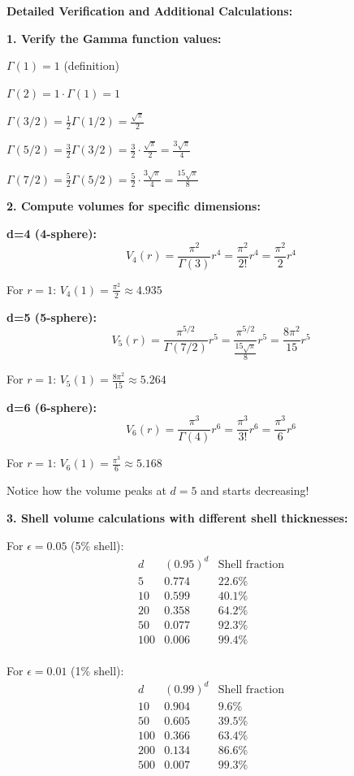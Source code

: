 \documentclass[12pt]{article}
\begin{document}
\begin{computation}
\textbf{Detailed Verification and Additional Calculations:}

\textbf{1. Verify the Gamma function values:}

\(\Gamma(1) = 1\) (definition)

\(\Gamma(2) = 1 \cdot \Gamma(1) = 1\)

\(\Gamma(3/2) = \frac{1}{2} \Gamma(1/2) = \frac{\sqrt{\pi}}{2}\)

\(\Gamma(5/2) = \frac{3}{2} \Gamma(3/2) = \frac{3}{2} \cdot \frac{\sqrt{\pi}}{2} = \frac{3\sqrt{\pi}}{4}\)

\(\Gamma(7/2) = \frac{5}{2} \Gamma(5/2) = \frac{5}{2} \cdot \frac{3\sqrt{\pi}}{4} = \frac{15\sqrt{\pi}}{8}\)

\textbf{2. Compute volumes for specific dimensions:}

\textbf{d=4 (4-sphere):}
\[
V_4(r) = \frac{\pi^2}{\Gamma(3)} r^4 = \frac{\pi^2}{2!} r^4 = \frac{\pi^2}{2} r^4
\]

For \(r=1\): \(V_4(1) = \frac{\pi^2}{2} \approx 4.935\)

\textbf{d=5 (5-sphere):}
\[
V_5(r) = \frac{\pi^{5/2}}{\Gamma(7/2)} r^5 = \frac{\pi^{5/2}}{\frac{15\sqrt{\pi}}{8}} r^5 = \frac{8\pi^2}{15} r^5
\]

For \(r=1\): \(V_5(1) = \frac{8\pi^2}{15} \approx 5.264\)

\textbf{d=6 (6-sphere):}
\[
V_6(r) = \frac{\pi^3}{\Gamma(4)} r^6 = \frac{\pi^3}{3!} r^6 = \frac{\pi^3}{6} r^6
\]

For \(r=1\): \(V_6(1) = \frac{\pi^3}{6} \approx 5.168\)

Notice how the volume peaks at \(d=5\) and starts decreasing!

\textbf{3. Shell volume calculations with different shell thicknesses:}

For \(\epsilon = 0.05\) (5\% shell):
\[
\begin{array}{c|c|c}
d & (0.95)^d & \text{Shell fraction} \\
\hline
5 & 0.774 & 22.6\% \\
10 & 0.599 & 40.1\% \\
20 & 0.358 & 64.2\% \\
50 & 0.077 & 92.3\% \\
100 & 0.006 & 99.4\% \\
\end{array}
\]

For \(\epsilon = 0.01\) (1\% shell):
\[
\begin{array}{c|c|c}
d & (0.99)^d & \text{Shell fraction} \\
\hline
10 & 0.904 & 9.6\% \\
50 & 0.605 & 39.5\% \\
100 & 0.366 & 63.4\% \\
200 & 0.134 & 86.6\% \\
500 & 0.007 & 99.3\% \\
\end{array}
\]


\end{computation}
\end{document}
